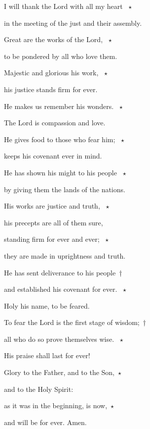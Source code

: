 \noindent I will thank the Lord with all my heart ~$\star$~\nopagebreak

in the meeting of the just and their assembly.

\noindent Great are the works of the Lord, ~$\star$~\nopagebreak

to be pondered by all who love them.



\noindent Majestic and glorious his work, ~$\star$~\nopagebreak

his justice stands firm for ever.

\noindent He makes us remember his wonders. ~$\star$~\nopagebreak

The Lord is compassion and love.



\noindent He gives food to those who fear him; ~$\star$~\nopagebreak

keeps his covenant ever in mind.

\noindent He has shown his might to his people ~$\star$~\nopagebreak

by giving them the lands of the nations.



\noindent His works are justice and truth, ~$\star$~\nopagebreak

his precepts are all of them sure,

\noindent standing firm for ever and ever; ~$\star$~\nopagebreak

they are made in uprightness and truth.



\noindent He has sent deliverance to his people~†~\nopagebreak

and established his covenant for ever. ~$\star$~\nopagebreak

Holy his name, to be feared.



\noindent To fear the Lord is the first stage of wisdom;~†~\nopagebreak

all who do so prove themselves wise. ~$\star$~\nopagebreak

His praise shall last for ever!



\noindent Glory to the Father, and to the Son,~$\star$~\nopagebreak

and to the Holy Spirit:

\noindent as it was in the beginning, is now,~$\star$~\nopagebreak

and will be for ever. Amen.
